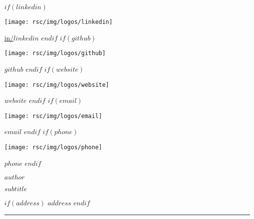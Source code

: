 \documentclass[
$if(fontsize)$
    $fontsize$,
$endif$
$if(lang)$
    $babel-lang$,
$endif$
$if(papersize)$
    $papersize$paper,
$endif$
$for(classoption)$
    $classoption$$sep$,
$endfor$
]{$documentclass$}
\makeatletter
\newcommand{\HRule}{\noindent\rule{\linewidth}{0.1mm}}
\newcommand{\setlocalcolumnwidth}[1]{%
  \let\oldratio\pcol@columnratioleft
  \setcolumnwidth{#1}%
}
\newcommand{\restorelocalcolumnwidth}{%
  \let\pcol@columnratioleft\oldratio%
}
\makeatother
\begin{document}
\vspace*{-2cm}
\setlocalcolumnwidth{3cm, 10cm, 4cm}
\begin{paracol}{3}
\begin{flushleft}
    \scriptsize
    \vspace*{\fill}
    $if(linkedin)$
        \begin{minipage}{0.8\baselineskip}
            \texttt{[image: rsc/img/logos/linkedin]}
        \end{minipage}
        \href{https://www.linkedin.com/in/$linkedin$}{in/$linkedin$}
        \linebreak
    $endif$
    $if(github)$
        \begin{minipage}{0.8\baselineskip}
            \texttt{[image: rsc/img/logos/github]}
        \end{minipage}
        \href{https://github.com/$github$}{$github$}
        \linebreak
    $endif$
    $if(website)$
        \begin{minipage}{0.8\baselineskip}
            \texttt{[image: rsc/img/logos/website]}
        \end{minipage}
        \href{https://$website$}{$website$}
        \linebreak
    $endif$
    $if(email)$
        \begin{minipage}{0.8\baselineskip}
            \texttt{[image: rsc/img/logos/email]}
        \end{minipage}
        \href{mailto:$email$?subject=Heyy!&body=What can I do for you? :)}{$email$}
        \linebreak
    $endif$
    $if(phone)$
        \begin{minipage}{0.8\baselineskip}
            \texttt{[image: rsc/img/logos/phone]}
        \end{minipage}
        $phone$
    $endif$
\end{flushleft}
\switchcolumn[1]

\begin{center}
    \huge
    \vspace*{\fill}
    \textbf{$author$}
    \vspace{0.1cm}

    \scriptsize
    $subtitle$
\end{center}
\switchcolumn[2]

\begin{flushright}
    \scriptsize
    \vspace*{\fill}
    $if(address)$
        $address$
    $endif$
\end{flushright}
\end{paracol}
\restorelocalcolumnwidth
\vspace{-0.3cm}
\HRule
\vspace{0cm}
\thispagestyle{fancy}
\end{document}
